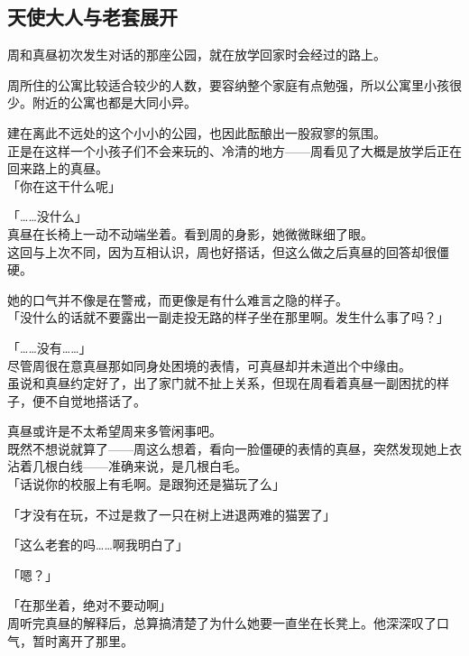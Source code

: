 \subsection{天使大人与老套展开}

周和真昼初次发生对话的那座公园，就在放学回家时会经过的路上。

周所住的公寓比较适合较少的人数，要容纳整个家庭有点勉强，所以公寓里小孩很少。附近的公寓也都是大同小异。

建在离此不远处的这个小小的公园，也因此酝酿出一股寂寥的氛围。\\

正是在这样一个小孩子们不会来玩的、冷清的地方——周看见了大概是放学后正在回来路上的真昼。\\

「你在这干什么呢」

「……没什么」\\

真昼在长椅上一动不动端坐着。看到周的身影，她微微眯细了眼。\\

这回与上次不同，因为互相认识，周也好搭话，但这么做之后真昼的回答却很僵硬。

她的口气并不像是在警戒，而更像是有什么难言之隐的样子。\\

「没什么的话就不要露出一副走投无路的样子坐在那里啊。发生什么事了吗？」

「……没有……」\\

尽管周很在意真昼那如同身处困境的表情，可真昼却并未道出个中缘由。\\

虽说和真昼约定好了，出了家门就不扯上关系，但现在周看着真昼一副困扰的样子，便不自觉地搭话了。

真昼或许是不太希望周来多管闲事吧。\\

既然不想说就算了——周这么想着，看向一脸僵硬的表情的真昼，突然发现她上衣沾着几根白线——准确来说，是几根白毛。\\

「话说你的校服上有毛啊。是跟狗还是猫玩了么」

「才没有在玩，不过是救了一只在树上进退两难的猫罢了」

「这么老套的吗……啊我明白了」

「嗯？」

「在那坐着，绝对不要动啊」\\

周听完真昼的解释后，总算搞清楚了为什么她要一直坐在长凳上。他深深叹了口气，暂时离开了那里。\\

